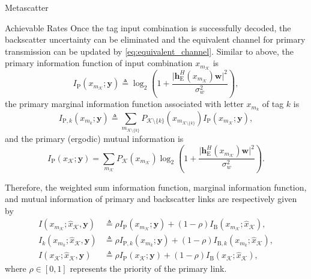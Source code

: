 \documentclass[journal]{IEEEtran}
\begin{document}
\begin{section}{Metascatter}
\begin{subsection}{Achievable Rates}
		Once the tag input combination is successfully decoded, the backscatter uncertainty can be eliminated and the equivalent channel for primary transmission can be updated by \eqref{eq:equivalent_channel}.
		Similar to above, the primary information function of input combination $x_{m_{\mathcal{K}}}$ is
		\begin{equation}
			I_{\mathrm{P}}(x_{m_{\mathcal{K}}};\boldsymbol{y}) \triangleq \log_2 \left(1 + \frac{\lvert \boldsymbol{h}_{\mathrm{E}}^H(x_{m_{\mathcal{K}}}) \boldsymbol{w} \rvert^2}{\sigma_w^2}\right),
			\label{eq:primary_information_function}
		\end{equation}
		the primary marginal information function associated with letter $x_{m_k}$ of tag $k$ is
		\begin{equation}
			I_{\mathrm{P},k}(x_{m_k};\boldsymbol{y}) \triangleq \sum_{m_{\mathcal{K} \setminus \{k\}}} P_{\mathcal{K} \setminus \{k\}}(x_{m_{\mathcal{K} \setminus \{k\}}}) I_{\mathrm{P}}(x_{m_{\mathcal{K}}};\boldsymbol{y}),
			\label{eq:primary_marginal_information_function}
		\end{equation}
		and the primary (ergodic) mutual information is
		\begin{equation}
			I_{\mathrm{P}}(x_{\mathcal{K}};\boldsymbol{y}) = \sum_{m_{\mathcal{K}}} P_{\mathcal{K}}(x_{m_{\mathcal{K}}}) \log_2 \left(1 + \frac{\lvert \boldsymbol{h}_{\mathrm{E}}^H(x_{m_{\mathcal{K}}}) \boldsymbol{w} \rvert^2}{\sigma_w^2}\right).
			\label{eq:primary_mutual_information}
		\end{equation}

		Therefore, the weighted sum information function, marginal information function, and mutual information of primary and backscatter links are respectively given by
		\begin{align}
			I(x_{m_{\mathcal{K}}};\hat{x}_{\mathcal{K}},\boldsymbol{y})
			 & \triangleq \rho I_{\mathrm{P}}(x_{m_{\mathcal{K}}};\boldsymbol{y}) + (1 - \rho) I_{\mathrm{B}}(x_{m_{\mathcal{K}}};\hat{x}_{\mathcal{K}}),\label{eq:weighted_sum_information_function} \\
			I_k(x_{m_k};\hat{x}_{\mathcal{K}},\boldsymbol{y})
			 & \triangleq \rho I_{\mathrm{P},k}(x_{m_k};\boldsymbol{y}) + (1 - \rho) I_{\mathrm{B},k}(x_{m_k};\hat{x}_{\mathcal{K}}),\label{eq:weighted_sum_marginal_information}                     \\
			I(x_{\mathcal{K}};\hat{x}_{\mathcal{K}},\boldsymbol{y})
			 & \triangleq \rho I_{\mathrm{P}}(x_{\mathcal{K}};\boldsymbol{y}) + (1 - \rho) I_{\mathrm{B}}(x_{\mathcal{K}};\hat{x}_{\mathcal{K}}),\label{eq:weighted_sum_mutual_information}
		\end{align}
		where $\rho \in [0,1]$ represents the priority of the primary link.
	\end{subsection}
\end{section}
\end{document}
